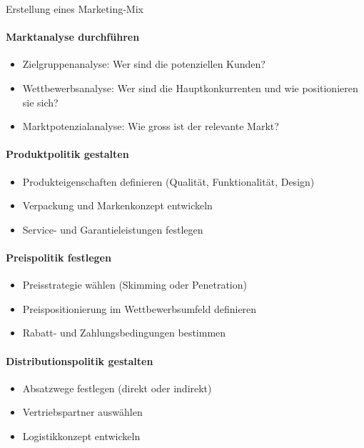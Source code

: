 \begin{KR}{Erstellung eines Marketing-Mix}\\
\paragraph{Marktanalyse durchführen}
\begin{itemize}
    \item Zielgruppenanalyse: Wer sind die potenziellen Kunden?
    \item Wettbewerbsanalyse: Wer sind die Hauptkonkurrenten und wie positionieren sie sich?
    \item Marktpotenzialanalyse: Wie gross ist der relevante Markt?
\end{itemize}

\paragraph{Produktpolitik gestalten}
\begin{itemize}
    \item Produkteigenschaften definieren (Qualität, Funktionalität, Design)
    \item Verpackung und Markenkonzept entwickeln
    \item Service- und Garantieleistungen festlegen
\end{itemize}

\paragraph{Preispolitik festlegen}
\begin{itemize}
    \item Preisstrategie wählen (Skimming oder Penetration)
    \item Preispositionierung im Wettbewerbsumfeld definieren
    \item Rabatt- und Zahlungsbedingungen bestimmen
\end{itemize}

\paragraph{Distributionspolitik gestalten}
\begin{itemize}
    \item Absatzwege festlegen (direkt oder indirekt)
    \item Vertriebspartner auswählen
    \item Logistikkonzept entwickeln
\end{itemize}


\end{KR}
